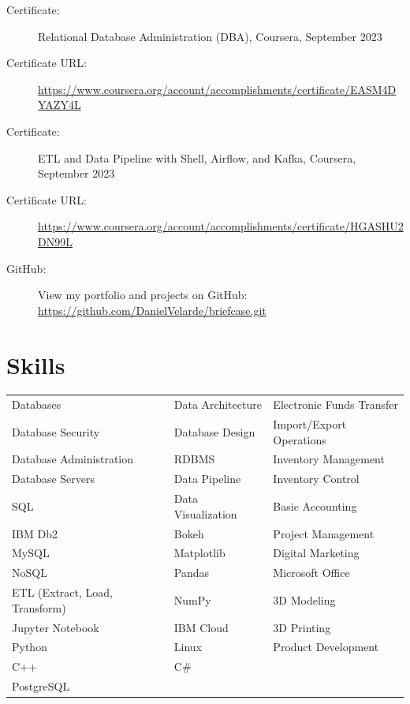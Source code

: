 \documentclass[a4paper,10pt]{article}
\begin{document}
\vspace{1pt} %

\begin{description}
    \item[Certificate:] Relational Database Administration (DBA), Coursera, September 2023
    \item[Certificate URL:] \url{https://www.coursera.org/account/accomplishments/certificate/EASM4DYAZY4L}
\end{description}

\vspace{1pt} %

\begin{description}
    \item[Certificate:] ETL and Data Pipeline with Shell, Airflow, and Kafka, Coursera, September 2023
    \item[Certificate URL:] \url{https://www.coursera.org/account/accomplishments/certificate/HGASHU2DN99L}
\end{description}
\begin{description}
    \item[GitHub:] View my portfolio and projects on GitHub: \url{https://github.com/DanielVelarde/briefcase.git}
\end{description}

\section*{Skills}
\begin{tabular}{p{4.5cm}p{4.5cm}p{4.5cm}}
    Databases & Data Architecture & Electronic Funds Transfer \\
    Database Security & Database Design & Import/Export Operations \\
    Database Administration & RDBMS & Inventory Management \\
    Database Servers & Data Pipeline & Inventory Control \\
    SQL & Data Visualization & Basic Accounting \\
    IBM Db2 & Bokeh & Project Management \\
    MySQL & Matplotlib & Digital Marketing \\
    NoSQL & Pandas & Microsoft Office \\
    ETL (Extract, Load, Transform) & NumPy & 3D Modeling \\
    Jupyter Notebook & IBM Cloud & 3D Printing \\
    Python & Linux & Product Development \\
    C++ & C\# & \\
    PostgreSQL & & \\
\end{tabular}
\end{document}
